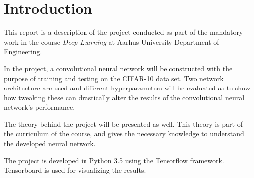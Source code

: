 \chapter{Introduction}
\label{chp:intro}

This report is a description of the project conducted as part of the mandatory work in the course \emph{Deep Learning} at Aarhus University Department of Engineering.

In the project, a convolutional neural network will be constructed with the purpose of training and testing on the CIFAR-10 data set. Two network architecture are used and different hyperparameters will be evaluated as to show how tweaking these can drastically alter the results of the convolutional neural network's performance. 

The theory behind the project will be presented as well. This theory is part of the curriculum of the course, and gives the necessary knowledge to understand the developed neural network. 

The project is developed in Python 3.5 using the Tensorflow framework. Tensorboard is used for visualizing the results. 